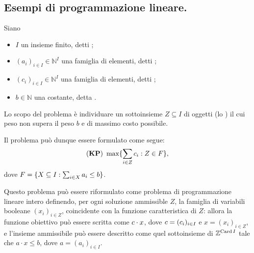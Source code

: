 \subsection{Esempi di programmazione lineare.}\label{EsempiDiProgrammazioneLineare}
\begin{Example}
	 Siano
	\begin{itemize}
		\item $I$ un insieme finito, detti ;
		\item $(a_i)_{i \in I} \in \mathbb{N}^I$ una famiglia di elementi, detti ;
		\item $(c_i)_{i \in I} \in \mathbb{N}^I$ una famiglia di elementi, detti ;
		\item $b \in \mathbb{N}$ una costante, detta .
	\end{itemize}
	Lo scopo del problema \`e individuare un sottoinsieme $Z \subseteq I$ di oggetti (lo ) il cui peso non supera il peso $b$ e di massimo costo possibile.
	\par Il problema pu\`o dunque essere formulato come segue:
	$$(\textbf{KP})\ \max \lbrace \sum_{i \in Z} c_i: Z \in F \rbrace,$$
	dove $F = \lbrace X \subseteq I: \sum_{i \in X} a_i \leq b \rbrace$.
	\par Questo problema pu\`o essere riformulato come problema di programmazione lineare intero definendo, per ogni soluzione ammissible $Z$, la famiglia di variabili booleane $(x_i)_{i \in Z}$, coincidente con la funzione caratteristica di $Z$: allora la funzione obiettivo pu\`o essere scritta come $c \cdot x$, dove $c = (c_i)_{i \in I}$ e $x = (x_i)_{i \in Z}$, e l'insieme ammissibile pu\`o essere descritto come quel sottoinsieme di $\mathbb{Z}^{\operatorname{Card}{I}}$ tale che $a \cdot x \leq b$, dove $a = (a_i)_{i \in I}$.
\end{Example}
